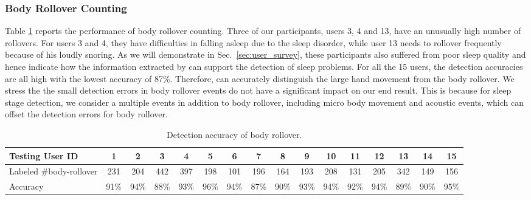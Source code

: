 \subsubsection{Body Rollover Counting}
Table \ref{tab:rollver} reports the performance of body rollover counting. Three of our participants, users 3, 4 and 13, have an unusually
high number of rollovers. For users 3 and 4, they have difficulties in falling asleep due to the sleep disorder, while user 13 needs to
rollover frequently because of his loudly snoring. As we will demonstrate in Sec.~\ref{sec:user_survey}, these participants also suffered
from poor sleep quality and hence indicate how the information extracted by {\systemname} can support the detection of sleep problems. For
all the 15 users, the detection accuracies are all high with the lowest accuracy of 87\%. Therefore, {\systemname} can accurately
distinguish the large hand movement from the body rollover. We stress the the small detection errors in body rollover events do not have a
significant impact on our end result. This is because for sleep stage detection, we consider a multiple events in addition to body
rollover, including micro body movement and acoustic events, which can offset the detection errors for body rollover.

\begin{table}[!t]\footnotesize
  \caption{Detection accuracy of body rollover.}\label{tab:rollver}
  \setlength{\tabcolsep}{3pt}
\renewcommand{\arraystretch}{0.67}{\multirowsetup}{\centering}
        \begin{tabular}{lccccccccccccccc}
        \toprule
         \textbf{Testing User ID}    & 1& 2  & 3& 4& 5& 6& 7& 8& 9& 10& 11& 12& 13& 14& 15\\
        \midrule
            \rowcolor{Gray} {Labeled \#body-rollover}  &231&204&442&397&198&101&196&164&193&208&131&205&342&149&156 \\
                 {Accuracy} &91\%& 94\% &88\%&93\%&96\%&94\%&87\%&90\% &93\% &94\% &92\% &94\% &89\% &90\% &95\%\\
        \bottomrule
 \end{tabular}
\end{table}

